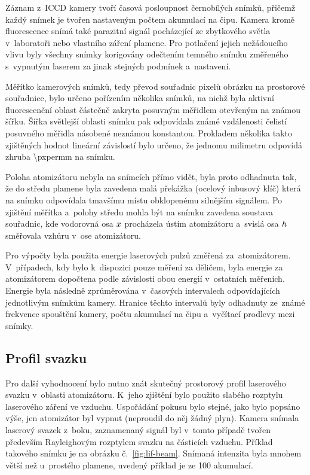 Záznam z~ICCD kamery tvoří časová posloupnost černobílých sním\-ků,
přičemž každý snímek je tvořen nastaveným počtem akumulací na čipu.
Kamera kromě fluorescence snímá také parazitní signál pocházející
ze zbytkového světla v~laboratoři nebo vlastního záření plamene.
Pro potlačení jejich nežádoucího vlivu
byly všechny snímky korigovány odečtením temného snímku změřeného
s~vypnutým laserem za jinak stejných podmínek a~nastavení.

Měřítko kamerových snímků, tedy převod souřadnic pixelů obrázku
na prostorové souřadnice, bylo určeno pořízením několika snímků,
na nichž byla aktivní fluorescenční oblast částečně zakryta posuvným
měřidlem otevřeným na známou šířku.
Šířka světlejší oblasti snímku pak odpovídala známé vzdálenosti čelistí
posuvného měřidla násobené neznámou konstantou.
Prokladem několika takto zjištěných hodnot lineární závislostí
bylo určeno, že jednomu milimetru odpovídá zhruba
\SI[round-mode=places,round-precision=1]{\pxpermm}{\pixel} na snímku.

Poloha atomizátoru nebyla na snímcích přímo vidět, byla proto odhadnuta tak,
že do středu plamene byla zavedena malá překážka (ocelový inbusový klíč)
která na snímku odpovídala tmavšímu místu obklopenému silnějším signálem.
Po zjištění měřítka a~polohy středu mohla být na snímku zavedena soustava
souřadnic, kde vodorovná osa $x$ procházela ústím atomizátoru
a~svislá osa $h$ směřovala vzhůru v~ose atomizátoru.

Pro výpočty byla použita energie laserových pulzů změřená za~atomizátorem.
V~případech, kdy bylo k~dispozici pouze měření za děličem,
byla energie za atomizátorem dopočtena podle závislosti obou energií
v~ostatních měřeních.
Energie byla následně zprůměrována v~časových intervalech odpovídajících
jednotlivým snímkům kamery.
Hranice těchto intervalů byly odhadnuty ze~známé frekvence spouštění
kamery, počtu akumulací na čipu a~vyčítací prodlevy mezi sním\-ky.

\subsection{Profil svazku}
\label{sec:lif-rayleigh}
Pro další vyhodnocení bylo nutno znát skutečný prostorový profil
laserového svazku v~oblasti atomizátoru.
K~jeho zjištění bylo použito slabého rozptylu laserového záření ve vzduchu.
Uspořádání pokusu bylo stejné, jako bylo popsáno výše,
jen atomizátor byl vypnut (neproudil do něj žádný plyn).
Kamera snímala laserový svazek z~boku, zaznamenaný signál byl v~tomto
případě tvořen především Rayleighovým rozptylem svazku na částicích vzduchu.
Příklad takového snímku je na obrázku č.~\ref{fig:lif-beam}.
Snímaná intenzita byla mnohem větší než u~prostého plamene,
uvedený příklad je ze \num{100} akumulací.

